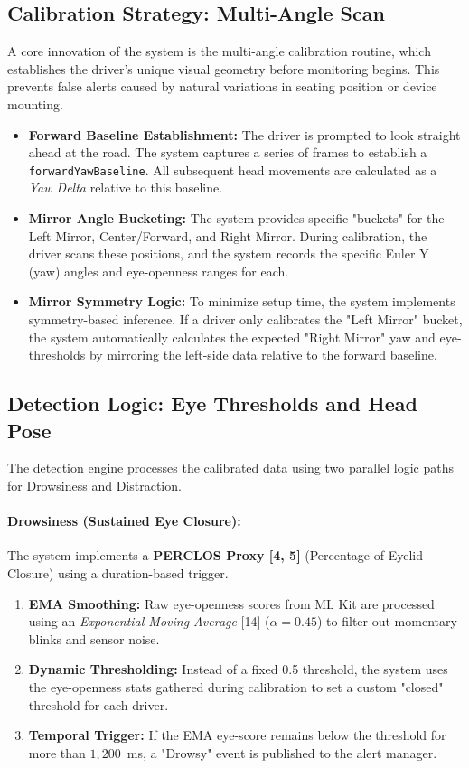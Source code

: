 \documentclass[11pt]{report}
\begin{document}
\subsection{Calibration Strategy: Multi-Angle Scan}
A core innovation of the system is the multi-angle calibration routine, which establishes the driver's unique visual geometry before monitoring begins. This prevents false alerts caused by natural variations in seating position or device mounting.

\begin{itemize}
    \item \textbf{Forward Baseline Establishment:} The driver is prompted to look straight ahead at the road. The system captures a series of frames to establish a \texttt{forwardYawBaseline}. All subsequent head movements are calculated as a \textit{Yaw Delta} relative to this baseline.
    \item \textbf{Mirror Angle Bucketing:} The system provides specific "buckets" for the Left Mirror, Center/Forward, and Right Mirror. During calibration, the driver scans these positions, and the system records the specific Euler Y (yaw) angles and eye-openness ranges for each.
    \item \textbf{Mirror Symmetry Logic:} To minimize setup time, the system implements symmetry-based inference. If a driver only calibrates the "Left Mirror" bucket, the system automatically calculates the expected "Right Mirror" yaw and eye-thresholds by mirroring the left-side data relative to the forward baseline.
\end{itemize}

\subsection{Detection Logic: Eye Thresholds and Head Pose}
The detection engine processes the calibrated data using two parallel logic paths for Drowsiness and Distraction.

\paragraph{Drowsiness (Sustained Eye Closure):}
The system implements a \textbf{PERCLOS Proxy [4, 5]} (Percentage of Eyelid Closure) using a duration-based trigger.
\begin{enumerate}
    \item \textbf{EMA Smoothing:} Raw eye-openness scores from ML Kit are processed using an \textit{Exponential Moving Average} [14] ($\alpha = 0.45$) to filter out momentary blinks and sensor noise.
    \item \textbf{Dynamic Thresholding:} Instead of a fixed 0.5 threshold, the system uses the eye-openness stats gathered during calibration to set a custom "closed" threshold for each driver.
    \item \textbf{Temporal Trigger:} If the EMA eye-score remains below the threshold for more than $1{,}200$~ms, a "Drowsy" event is published to the alert manager.
\end{enumerate}
\end{document}
